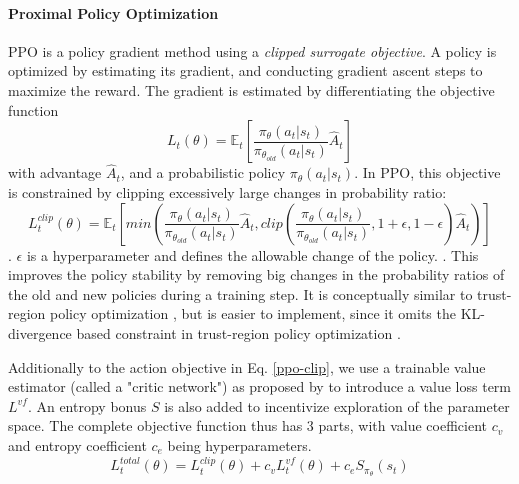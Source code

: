\documentclass[dvipsnames]{article} %
\newcommand{\comment}[1]{}
\newcommand{\as}[1] {\comment{{\color{orange} AS: #1}}}              %
\begin{document}
\paragraph{Proximal Policy Optimization}
PPO is a policy gradient method using a \textit{clipped surrogate objective}. A policy is optimized by estimating its gradient, and conducting gradient ascent steps to maximize the reward. The gradient is estimated by differentiating the objective function
\begin{equation}
    L_t(\theta) = \mathbb{E}_t\left[\frac{\pi_\theta(a_t|s_t)}{\pi_{\theta_{old}}(a_t|s_t)}\hat{A}_t\right]
\end{equation}
with advantage $\hat{A}_t$, and a probabilistic policy $\pi_{\theta}(a_t|s_t)$. In PPO, this objective is constrained by clipping excessively large changes in probability ratio:
\begin{equation}
\label{ppo-clip}
    L^{clip}_t(\theta)  = \mathbb{E}_t \left[min\left(\frac{\pi_\theta(a_t|s_t)}{\pi_{\theta_{old}}(a_t|s_t)}\hat{A}_t, clip\left(\frac{\pi_\theta(a_t|s_t)}{\pi_{\theta_{old}}(a_t|s_t)}, 1+\epsilon,1-\epsilon \right)\hat{A}_t\right)\right] 
\end{equation}
\citep{ppo}. $\epsilon$ is a hyperparameter and defines the allowable change of the policy. \as{There are some parameters still not defined, like $\pi_\theta$, make sure they all clear what they are}. This improves the policy stability by removing big changes in the probability ratios of the old and new policies during a training step. It is conceptually similar to trust-region policy optimization \cite{trpo}, but is easier to implement, since it omits the KL-divergence based constraint in trust-region policy optimization \as{I think you are abusing the use of acronyms, if you plan to use them less than 5 times, do not use the acronym}. 

Additionally to the action objective in Eq. \ref{ppo-clip}, we use a trainable value estimator (called a "critic network") as proposed by \citet{gae} to introduce a value loss term $L^{vf}$. An entropy bonus $S$ is also added to incentivize exploration of the parameter space. The complete objective function thus has 3 parts, with value coefficient $c_v$ and entropy coefficient $c_e$ being hyperparameters.
\begin{equation}
\label{ppo-actorcritic}
    L^{total}_t(\theta) = L^{clip}_t(\theta)+ c_vL^{vf}_t(\theta)+c_eS_{\pi_\theta}(s_t)
\end{equation}
\end{document}
